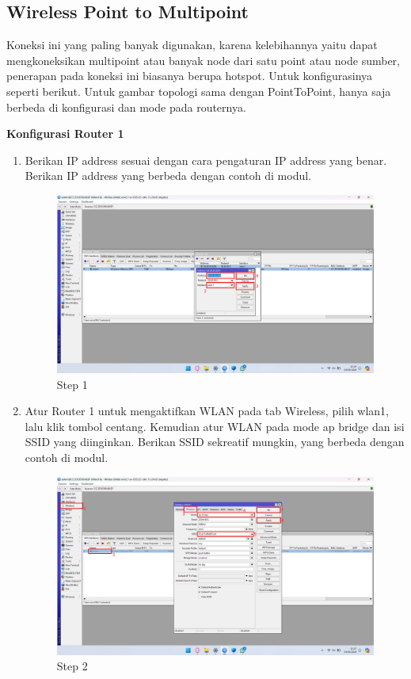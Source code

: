\subsection{Wireless Point to Multipoint}
Koneksi ini yang paling banyak digunakan, karena kelebihannya yaitu dapat mengkoneksikan
multipoint atau banyak node dari satu point atau node sumber, penerapan pada koneksi ini
biasanya berupa hotspot. Untuk konfigurasinya seperti berikut.
Untuk gambar topologi sama dengan PointToPoint, hanya saja berbeda di konfigurasi dan
mode pada routernya.
\begin{center}
	\textbf{Konfigurasi Router 1}
	\begin{enumerate}
		\item Berikan IP address sesuai dengan cara pengaturan IP address yang benar. Berikan IP address yang berbeda dengan contoh di modul.
		\begin{figure}[H]
			\centering
			\includegraphics[width=0.9\linewidth]{P1/img/per1/pc1/Step 2.2.png}
			\caption{Step 1}
			\label{fig:Step 1(Per.2 PC1)}
		\end{figure}
		\item Atur Router 1 untuk mengaktifkan WLAN pada tab Wireless, pilih wlan1, lalu klik tombol centang. Kemudian atur WLAN pada mode ap bridge dan isi SSID yang diinginkan. Berikan SSID sekreatif mungkin, yang berbeda dengan contoh di modul.
		\begin{figure}[H]
			\centering
			\includegraphics[width=0.9\linewidth]{P1/img/per2/pc1/Step 3.png}
			\caption{Step 2}
			\label{fig:Step 2(Per.2 PC1)}
		\end{figure}
	\end{enumerate}


\end{center}
